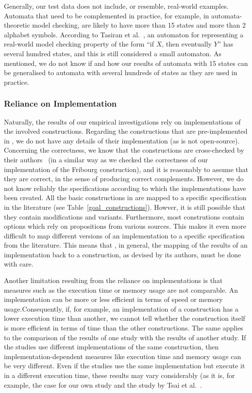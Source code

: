 Generally, our test data does not include, or resemble, real-world examples. Automata that need to be complemented in practice, for example, in automata-theoretic model checking, are likely to have more than 15 states and more than 2 alphabet symbols. According to Tasiran et al.~\cite{1995_tasiran}, an automaton for representing a real-world model checking property of the form ``if $X$, then eventually $Y$'' has several hundred states, and this is still considered a small automaton. As mentioned, we do not know if and how our results of automata with 15 states can be generalised to automata with several hundreds of states as they are used in practice.

\subsubsection{Reliance on Implementation}
Naturally, the results of our empirical investigations rely on implementations of the involved constructions. Regarding the constructions that are pre-implemented in \goal, we do not have any details of their implementation (as \goal{} is not open-source). Concerning the correctness, we know that the constructions are cross-checked by their authors~\cite{2008_goal_ext} (in a similar way as we checked the correctness of our implementation of the Fribourg construction), and it is reasonably to assume that they are correct, in the sense of producing correct complements. However, we do not know reliably the specifications according to which the implementations have been created. All the basic constructions in \goal{} are mapped to a specific specification in the literature (see Table~\ref{goal_constructions}). Howver, it is still possible that they contain modifications and variants. Furthermore, most construtions contain options which rely on propositions from various sources. This makes it even more difficult to map different versions of an implementation to a specific specification from the literature. This means that , in general, the mapping of the results of an implementation back to a construction, as devised by its authors, must be done with care.

Another limitation resulting from the reliance on implementations is that measures such as the execution time or memory usage are not comparable. An implementation can be more or less efficient in terms of speed or memory usage.Consequently, if, for example, an implementation of a construction has a lower execution time than another, we cannot tell whether the construction itself is more efficient in terms of time than the other constructions. The same applies to the comparison of the results of one study with the results of another study. If the studies use different implementations of the same construction, then  implementation-dependent measures like execution time and memory usage can be very different. Even if the studies use the same implementation but execute it in a different execution time, these results may vary considerably (as it is, for example, the case for our own study and the study by Tsai et al.~\cite{2011_tsai}.

